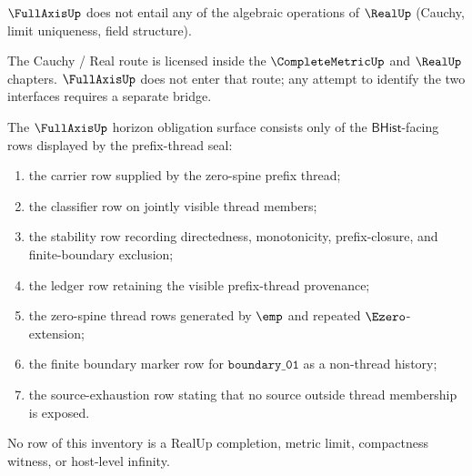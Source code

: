 \begin{theorem}
\label{thm:fullaxis-not-real-horizon}
\(\FullAxisUp\) does not entail any of the algebraic operations of \(\RealUp\) (Cauchy, limit uniqueness, field structure).
\end{theorem}

\begin{remark}
The Cauchy / Real route is licensed inside the \(\CompleteMetricUp\) and \(\RealUp\) chapters. \(\FullAxisUp\) does not enter that route; any attempt to identify the two interfaces requires a separate bridge.
\end{remark}

\begin{theorem}
\label{thm:fullaxis-prefix-thread-obligation-inventory}
The $\FullAxisUp$ horizon obligation surface consists only of the
$\mathsf{BHist}$-facing rows displayed by the prefix-thread seal:
\begin{enumerate}
\item the carrier row supplied by the zero-spine prefix thread;
\item the classifier row on jointly visible thread members;
\item the stability row recording directedness, monotonicity, prefix-closure,
and finite-boundary exclusion;
\item the ledger row retaining the visible prefix-thread provenance;
\item the zero-spine thread rows generated by $\emp$ and repeated
$\Ezero$-extension;
\item the finite boundary marker row for $\mathtt{boundary\_01}$ as a
non-thread history;
\item the source-exhaustion row stating that no source outside thread
membership is exposed.
\end{enumerate}
No row of this inventory is a RealUp completion, metric limit, compactness
witness, or host-level infinity.
\end{theorem}

